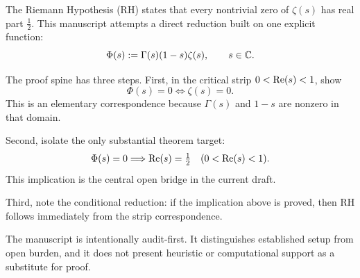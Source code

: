 The Riemann Hypothesis (RH) states that every nontrivial zero of $\zeta(s)$ has real part $\tfrac12$.
This manuscript attempts a direct reduction built on one explicit function:
\[
\Phi(s):=\Gamma(s)(1-s)\zeta(s),\qquad s\in\mathbb{C}.
\]

The proof spine has three steps.
First, in the critical strip $0<\operatorname{Re}(s)<1$, show
\[
\Phi(s)=0\iff\zeta(s)=0.
\]
This is an elementary correspondence because $\Gamma(s)$ and $1-s$ are nonzero in that domain.

Second, isolate the only substantial theorem target:
\[
\Phi(s)=0\Longrightarrow \operatorname{Re}(s)=\tfrac12
\quad (0<\operatorname{Re}(s)<1).
\]
This implication is the central open bridge in the current draft.

Third, note the conditional reduction: if the implication above is proved, then RH follows immediately from the strip correspondence.

The manuscript is intentionally audit-first.
It distinguishes established setup from open burden, and it does not present heuristic or computational support as a substitute for proof.
